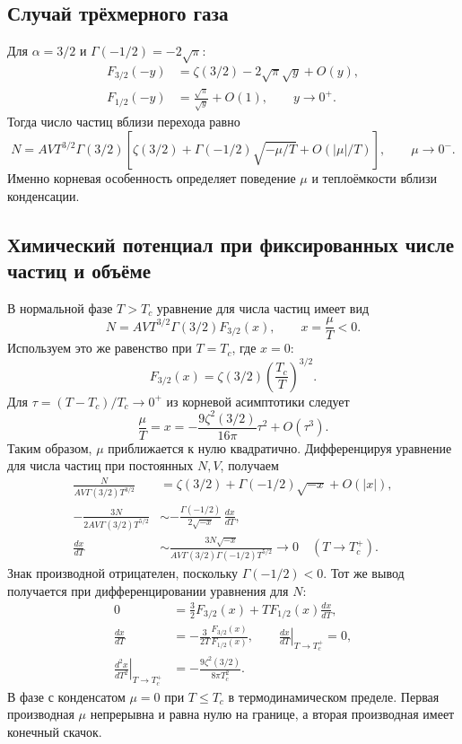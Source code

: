 \documentclass[../final.tex]{subfiles}
\begin{document}
\clearpage
\subsection{Случай трёхмерного газа}
Для $\alpha=3/2$ и $\Gamma(-1/2)=-2\sqrt\pi$:
\begin{align*}
 F_{3/2}(-y)&=\zeta(3/2)-2\sqrt\pi\sqrt y+O(y),\\
 F_{1/2}(-y)&=\frac{\sqrt\pi}{\sqrt y}+O(1),\qquad y\to0^+.
\end{align*}
Тогда число частиц вблизи перехода равно
\begin{equation*}
 N=AVT^{3/2}\Gamma(3/2)
 \left[\zeta(3/2)+\Gamma(-1/2)\sqrt{-\mu/T}
 +O(|\mu|/T)\right],\qquad\mu\to0^-.
\end{equation*}
Именно корневая особенность определяет поведение $\mu$ и теплоёмкости
вблизи конденсации.

\subsection{Химический потенциал при фиксированных числе частиц и объёме}
В нормальной фазе $T>T_c$ уравнение для числа частиц имеет вид
\begin{equation*}
 N=AVT^{3/2}\Gamma(3/2)F_{3/2}(x),\qquad x=\frac\mu T<0.
\end{equation*}
Используем это же равенство при $T=T_c$, где $x=0$:
\begin{equation*}
 F_{3/2}(x)=\zeta(3/2)\left(\frac{T_c}{T}\right)^{3/2}.
\end{equation*}
Для $\tau=(T-T_c)/T_c\to0^+$ из корневой асимптотики следует
\begin{equation*}
 \frac\mu T=x=-\frac{9\zeta^2(3/2)}{16\pi}\tau^2+O(\tau^3).
\end{equation*}
Таким образом, $\mu$ приближается к нулю квадратично.
Дифференцируя уравнение для числа частиц при постоянных $N,V$, получаем
\begin{align*}
 \frac{N}{AV\Gamma(3/2)T^{3/2}}
 &=\zeta(3/2)+\Gamma(-1/2)\sqrt{-x}+O(|x|),\\
 -\frac{3N}{2AV\Gamma(3/2)T^{5/2}}
 &\sim-\frac{\Gamma(-1/2)}{2\sqrt{-x}}\,\frac{dx}{dT},\\
 \frac{dx}{dT}&\sim
 \frac{3N\sqrt{-x}}{AV\Gamma(3/2)\Gamma(-1/2)T^{5/2}}
 \longrightarrow0\quad(T\to T_c^+).
\end{align*}
Знак производной отрицателен, поскольку $\Gamma(-1/2)<0$.
Тот же вывод получается при дифференцировании уравнения для $N$:
\begin{align*}
 0&=\frac32F_{3/2}(x)+TF_{1/2}(x)\frac{dx}{dT},\\
 \frac{dx}{dT}&=-\frac{3}{2T}\frac{F_{3/2}(x)}{F_{1/2}(x)},\qquad
 \left.\frac{dx}{dT}\right|_{T\to T_c^+}=0,\\
 \left.\frac{d^2x}{dT^2}\right|_{T\to T_c^+}
 &=-\frac{9\zeta^2(3/2)}{8\pi T_c^2}.
\end{align*}
В фазе с конденсатом $\mu=0$ при $T\leq T_c$ в термодинамическом пределе.
Первая производная $\mu$ непрерывна и равна нулю на границе,
а вторая производная имеет конечный скачок.
\end{document}
